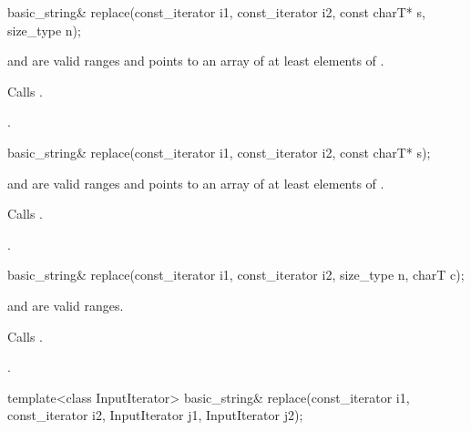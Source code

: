 %
\begin{itemdecl}
basic_string&
  replace(const_iterator i1, const_iterator i2, const charT* s, size_type n);
\end{itemdecl}

\begin{itemdescr}
\pnum
\requires {} and  are valid ranges and
 points to an array of at least  elements of .

\pnum
\effects Calls .

\pnum
\returns
{}.
\end{itemdescr}

%
\begin{itemdecl}
basic_string& replace(const_iterator i1, const_iterator i2, const charT* s);
\end{itemdecl}

\begin{itemdescr}
\pnum
\requires {} and  are valid ranges and
 points to an array of at least 
elements of .

\pnum
\effects Calls .

\pnum
\returns
{}.
\end{itemdescr}

%
\begin{itemdecl}
basic_string& replace(const_iterator i1, const_iterator i2, size_type n,
                      charT c);
\end{itemdecl}

\begin{itemdescr}
\pnum
\requires {} and  are valid ranges.

\pnum
\effects Calls .

\pnum
\returns
{}.
\end{itemdescr}

%
\begin{itemdecl}
template<class InputIterator>
  basic_string& replace(const_iterator i1, const_iterator i2,
                        InputIterator j1, InputIterator j2);
\end{itemdecl}

